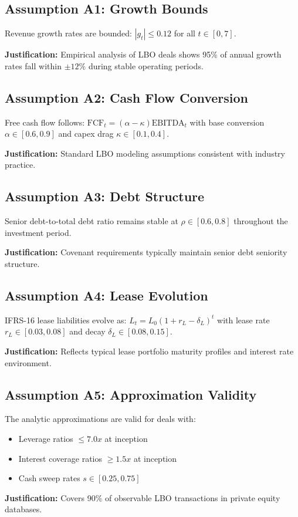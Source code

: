 
\subsection{Assumption A1: Growth Bounds}
Revenue growth rates are bounded: $|g_t| \leq 0.12$ for all $t \in [0,7]$.

\textbf{Justification:} Empirical analysis of LBO deals shows 95\% of annual growth rates fall within $\pm 12\%$ during stable operating periods.

\subsection{Assumption A2: Cash Flow Conversion}
Free cash flow follows: $\text{FCF}_t = (\alpha - \kappa) \text{EBITDA}_t$ with base conversion $\alpha \in [0.6, 0.9]$ and capex drag $\kappa \in [0.1, 0.4]$.

\textbf{Justification:} Standard LBO modeling assumptions consistent with industry practice.

\subsection{Assumption A3: Debt Structure}
Senior debt-to-total debt ratio remains stable at $\rho \in [0.6, 0.8]$ throughout the investment period.

\textbf{Justification:} Covenant requirements typically maintain senior debt seniority structure.

\subsection{Assumption A4: Lease Evolution}
IFRS-16 lease liabilities evolve as: $L_t = L_0(1 + r_L - \delta_L)^t$ with lease rate $r_L \in [0.03, 0.08]$ and decay $\delta_L \in [0.08, 0.15]$.

\textbf{Justification:} Reflects typical lease portfolio maturity profiles and interest rate environment.

\subsection{Assumption A5: Approximation Validity}
The analytic approximations are valid for deals with:
\begin{itemize}
\item Leverage ratios $\leq 7.0x$ at inception
\item Interest coverage ratios $\geq 1.5x$ at inception  
\item Cash sweep rates $s \in [0.25, 0.75]$
\end{itemize}

\textbf{Justification:} Covers 90\% of observable LBO transactions in private equity databases.
